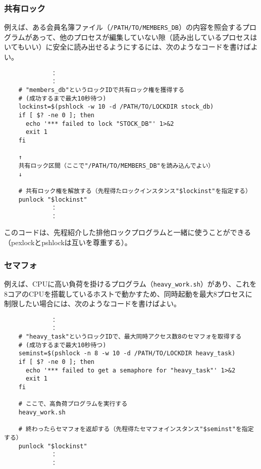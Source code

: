 \subsubsection*{共有ロック}
例えば、ある会員名簿ファイル（\verb|/PATH/TO/MEMBERS_DB|）の内容を照会するプログラムがあって、他のプロセスが編集していない隙（読み出しているプロセスはいてもいい）に安全に読み出せるようにするには、次のようなコードを書けばよい。\\
\begin{frameboxit}{160.0mm}
\begin{verbatim}
	         ：
	         ：
	# "members_db"というロックIDで共有ロック権を獲得する
	# (成功するまで最大10秒待つ)
	lockinst=$(pshlock -w 10 -d /PATH/TO/LOCKDIR stock_db)
	if [ $? -ne 0 ]; then
	  echo '*** failed to lock "STOCK_DB"' 1>&2
	  exit 1
	fi
	
	↑
	共有ロック区間（ここで"/PATH/TO/MEMBERS_DB"を読み込んでよい）
	↓

	# 共有ロック権を解放する（先程得たロックインスタンス"$lockinst"を指定する）
	punlock "$lockinst"
	         ：
	         ：
\end{verbatim}
\end{frameboxit}
このコードは、先程紹介した排他ロックプログラムと一緒に使うことができる（pexlockとpshlockは互いを尊重する）。

\subsubsection*{セマフォ}
例えば、CPUに高い負荷を掛けるプログラム（\verb|heavy_work.sh|）があり、これを8コアのCPUを搭載しているホストで動かすため、同時起動を最大8プロセスに制限したい場合には、次のようなコードを書けばよい。\\
\begin{frameboxit}{160.0mm}
\begin{verbatim}
	         ：
	         ：
	# "heavy_task"というロックIDで、最大同時アクセス数8のセマフォを取得する
	# (成功するまで最大10秒待つ)
	seminst=$(pshlock -n 8 -w 10 -d /PATH/TO/LOCKDIR heavy_task)
	if [ $? -ne 0 ]; then
	  echo '*** failed to get a semaphore for "heavy_task"' 1>&2
	  exit 1
	fi
	
	# ここで、高負荷プログラムを実行する
	heavy_work.sh
	
	# 終わったらセマフォを返却する（先程得たセマフォインスタンス"$seminst"を指定する）
	punlock "$lockinst"
	         ：
	         ：
\end{verbatim}
\end{frameboxit}

